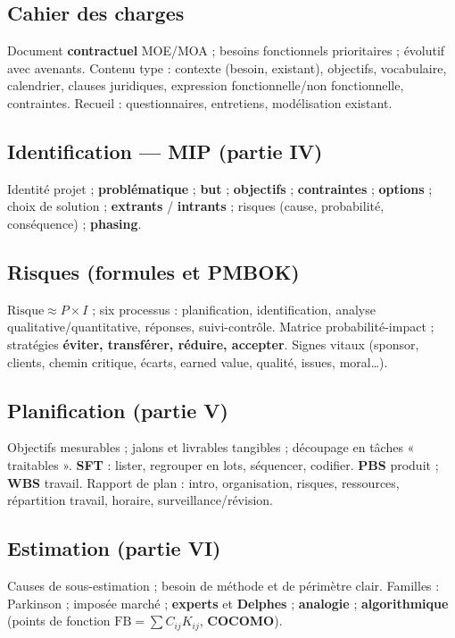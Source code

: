 \documentclass[11pt,a4paper]{article}
\begin{document}
\subsection{Cahier des charges}
Document \textbf{contractuel} MOE/MOA ; besoins fonctionnels prioritaires ; évolutif avec avenants. Contenu type : contexte (besoin, existant), objectifs, vocabulaire, calendrier, clauses juridiques, expression fonctionnelle/non fonctionnelle, contraintes. Recueil : questionnaires, entretiens, modélisation existant.

\subsection{Identification — MIP (partie IV)}
Identité projet ; \textbf{problématique} ; \textbf{but} ; \textbf{objectifs} ; \textbf{contraintes} ; \textbf{options} ; choix de solution ; \textbf{extrants} / \textbf{intrants} ; risques (cause, probabilité, conséquence) ; \textbf{phasing}.

\subsection{Risques (formules et PMBOK)}
$\mathrm{Risque} \approx P \times I$ ; six processus : planification, identification, analyse qualitative/quantitative, réponses, suivi-contrôle. Matrice probabilité-impact ; stratégies \textbf{éviter, transférer, réduire, accepter}. Signes vitaux (sponsor, clients, chemin critique, écarts, earned value, qualité, issues, moral\ldots).

\subsection{Planification (partie V)}
Objectifs mesurables ; jalons et livrables tangibles ; découpage en tâches « traitables ». \textbf{SFT} : lister, regrouper en lots, séquencer, codifier. \textbf{PBS} produit ; \textbf{WBS} travail. Rapport de plan : intro, organisation, risques, ressources, répartition travail, horaire, surveillance/révision.

\subsection{Estimation (partie VI)}
Causes de sous-estimation ; besoin de méthode et de périmètre clair. Familles : Parkinson ; imposée marché ; \textbf{experts} et \textbf{Delphes} ; \textbf{analogie} ; \textbf{algorithmique} (points de fonction $\mathrm{FB}=\sum C_{ij}K_{ij}$, \textbf{COCOMO}).
\end{document}
